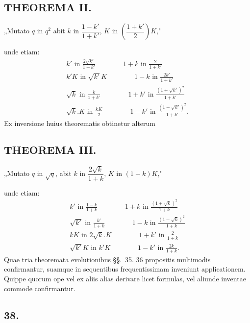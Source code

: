 \documentclass{article}
\begin{document}
\subsection*{THEOREMA II.}

„Mutato $q$ in $q^{2}$ abit $k$ in $\dfrac{1-k'}{1+k'}$, $K$ in $\left(\dfrac{1+k'}{2}\right)K$,"

unde etiam:
\[
\begin{gathered}
k'\text{ in }\frac{2\sqrt{k'}}{1+k'}\qquad\qquad 1+k\text{ in }\frac{2}{1+k'}
\\[2ex]
k'K\text{ in }\sqrt{k'}K\qquad\qquad 1-k\text{ in }\frac{2k'}{1+k'}
\\[2ex]
\sqrt{k}\text{ in }\frac{k}{1+k'}\qquad\qquad 1+k'\text{ in }\frac{(1+\sqrt{k'})^{2}}{1+k'}
\\[2ex]
\sqrt{k}.K\text{ in }\frac{kK}{2}\qquad\qquad 1-k'\text{ in }\frac{(1-\sqrt{k'})^{2}}{1+k'}.
\end{gathered}
\]
Ex inversione huius theorematis obtinetur alterum

\subsection*{THEOREMA III.}

„Mutato $q$ in $\sqrt{q}$, abit $k$ in $\dfrac{2\sqrt{k}}{1+k}$, $K$ in $(1+k)K$,"

unde etiam:
\[
\begin{gathered}
k'\text{ in }\frac{1-k}{1+k}\qquad\qquad 1+k\text{ in }\frac{(1+\sqrt{k})^{2}}{1+k}
\\[2ex]
\sqrt{k'}\text{ in }\frac{k'}{1+k}\qquad\qquad 1-k\text{ in }\frac{(1-\sqrt{k})^{2}}{1+k}
\\[2ex]
kK\text{ in }2\sqrt{k}.K\qquad\qquad 1+k'\text{ in }\frac{2}{1+k}
\\[2ex]
\sqrt{k'}K\text{ in }k'K\qquad\qquad 1-k'\text{ in }\frac{2k}{1+k}.
\end{gathered}
\]
Quae tria theoremata evolutionibus §§.\ 35. 36 propositis multimodis confirmantur, suamque in sequentibus frequentissimam inveniunt applicationem. Quippe quorum ope vel ex aliis alias derivare licet formulas, vel aliunde inventae commode confirmantur.

\subsection*{38.}
\end{document}
